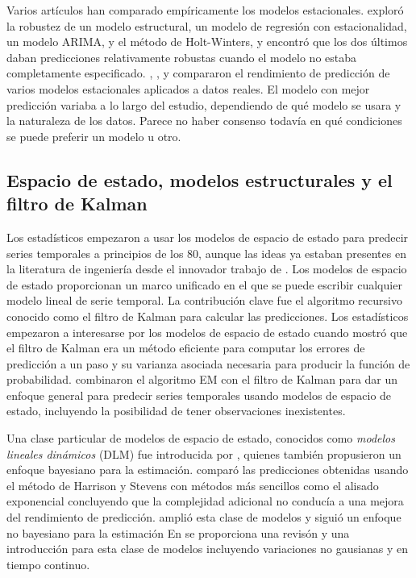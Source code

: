 \documentclass{llncs}
\begin{document}
Varios artículos han comparado empíricamente los modelos estacionales. \cite{Chen1997269} exploró la robustez de un modelo estructural, un modelo de regresión con estacionalidad, un modelo ARIMA, y el método de Holt-Winters, y encontró que los dos últimos daban predicciones relativamente robustas cuando el modelo no estaba completamente especificado. \cite{Noakes1985179}, \cite{Albertson1996345}, \cite{Kulendran1997319} y \cite{Franses200587} compararon el rendimiento de predicción de varios modelos estacionales aplicados a datos reales. El modelo con mejor predicción variaba a lo largo del estudio, dependiendo de qué modelo se usara y la naturaleza de los datos. Parece no haber consenso todavía en qué condiciones se puede preferir un modelo u otro.

\subsection{Espacio de estado, modelos estructurales y el filtro de Kalman}

Los estadísticos empezaron a usar los modelos de espacio de estado para predecir series temporales a principios de los 80, aunque las ideas ya estaban presentes en la literatura de ingeniería desde el innovador trabajo de \cite{Kalman196035}. Los modelos de espacio de estado proporcionan un marco unificado en el que se puede escribir cualquier modelo lineal de serie temporal. La contribución clave fue el algoritmo recursivo conocido como el filtro de Kalman para calcular las predicciones. Los estadísticos empezaron a interesarse por los modelos de espacio de estado cuando \cite{Schweppe196561} mostró que el filtro de Kalman era un método eficiente para computar los errores de predicción a un paso y su varianza asociada necesaria para producir la función de probabilidad. \cite{Shumway1982253} combinaron el algoritmo EM con el filtro de Kalman para dar un enfoque general para predecir series temporales usando modelos de espacio de estado, incluyendo la posibilidad de tener observaciones inexistentes.

Una clase particular de modelos de espacio de estado, conocidos como \emph{modelos lineales dinámicos} (DLM) fue introducida por \cite{Harrison1976205}, quienes también propusieron un enfoque bayesiano para la estimación. \cite{Fildes1983137} comparó las predicciones obtenidas usando el método de Harrison y Stevens con métodos más sencillos como el alisado exponencial concluyendo que la complejidad adicional no conducía a una mejora del rendimiento de predicción. \cite{Harvey1989} amplió esta clase de modelos y siguió un enfoque no bayesiano para la estimación En \cite{Harvey2006327} se proporciona una revisón y una introducción para esta clase de modelos incluyendo variaciones no gausianas y en tiempo continuo. 
\end{document}
